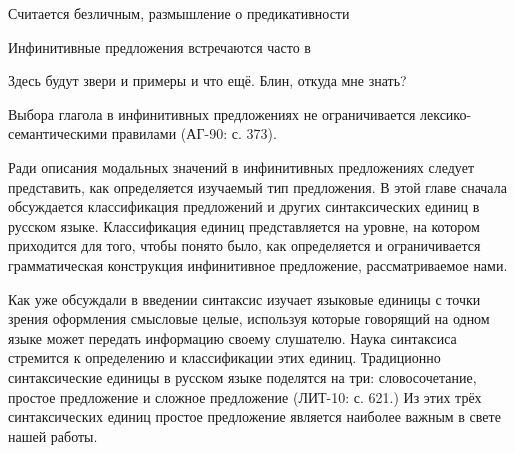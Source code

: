 Считается безличным, размышление о предикативности 

Инфинитивные предложения встречаются часто в 

Здесь будут звери и примеры и что ещё. Блин, откуда мне знать?	






Выбора глагола в инфинитивных предложениях не ограничивается лексико-семантическими правилами (АГ-90: с. 373).



Ради описания модальных значений в инфинитивных предложениях следует представить, как определяется изучаемый тип предложения. В этой главе сначала обсуждается классификация предложений и других синтаксических единиц в русском языке. Классификация единиц представляется на уровне, на котором приходится для того, чтобы понято было, как определяется и ограничивается грамматическая конструкция инфинитивное предложение, рассматриваемое нами.

Как уже обсуждали в введении синтаксис изучает языковые единицы с точки зрения оформления смысловые целые, используя которые говорящий на одном языке может передать информацию своему слушателю. Наука синтаксиса стремится к определению и классификации этих единиц. Традиционно синтаксические единицы в русском языке поделятся на три: словосочетание, простое предложение и сложное предложение (ЛИТ-10: с. 621.) Из этих трёх синтаксических единиц простое предложение является наиболее важным в свете нашей работы.



